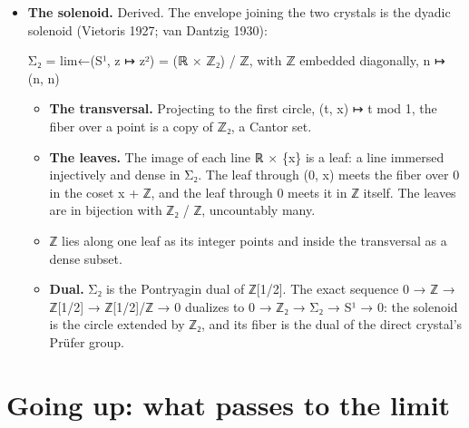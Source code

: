 \begin{itemize}
\begin{itemize}
\item ℤ is countable. ℤ₂ is in bijection with the bit sequences \{0,1\}\textasciicircum{}ℕ and uncountable, by Cantor's diagonal. ℤ₂ \textbackslash{} ℤ is uncountable.
\item Its part in ℚ, the rationals with odd denominators outside ℤ, is countable: the eventually periodic expansions. The machine reaches their windows through the exact quotient's inverse (1/3, above).
\item The computable elements of ℤ₂ are countable, and a program can produce any window of one. All but countably many elements are not computable: each has a window at every w, as every element does, yet no program produces its windows for every w.
\end{itemize}
\item \textbf{The solenoid.} Derived. The envelope joining the two crystals is the dyadic solenoid (Vietoris 1927; van Dantzig 1930):

Σ₂ = lim←(S¹, z ↦ z²) = (ℝ × ℤ₂) / ℤ, with ℤ embedded diagonally, n ↦ (n, n)

\begin{itemize}
\item \textbf{The transversal.} Projecting to the first circle, (t, x) ↦ t mod 1, the fiber over a point is a copy of ℤ₂, a Cantor set.
\item \textbf{The leaves.} The image of each line ℝ × \{x\} is a leaf: a line immersed injectively and dense in Σ₂. The leaf through (0, x) meets the fiber over 0 in the coset x + ℤ, and the leaf through 0 meets it in ℤ itself. The leaves are in bijection with ℤ₂ / ℤ, uncountably many.
\item ℤ lies along one leaf as its integer points and inside the transversal as a dense subset.
\item \textbf{Dual.} Σ₂ is the Pontryagin dual of ℤ[1/2]. The exact sequence 0 → ℤ → ℤ[1/2] → ℤ[1/2]/ℤ → 0 dualizes to 0 → ℤ₂ → Σ₂ → S¹ → 0: the solenoid is the circle extended by ℤ₂, and its fiber is the dual of the direct crystal's Prüfer group.
\end{itemize}
\end{itemize}

\section{\texorpdfstring{Going up: what passes to the limit}{Going up: what passes to the limit}}

